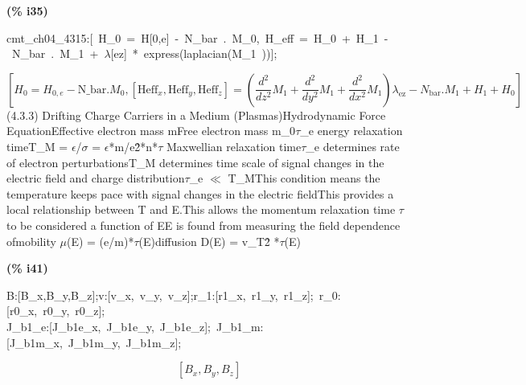 \documentclass[fleqn]{article}
\begin{document}
\noindent
\begin{minipage}[t]{4.000000em}\color{red}\bfseries
(\% i35)	
\end{minipage}
\begin{minipage}[t]{\textwidth}\color{blue}
cmt\_ch04\_4315:[\ H\_0\ =\ H[0,e]\ -\ N\_bar\ .\ M\_0,\ H\_eff\ =\ H\_0\ +\ H\_1\ -\ N\_bar\ .\ M\_1\ +\ \ensuremath{\lambda}[ez]\ *\ express(laplacian(M\_1\ ))];
\end{minipage}
\[\displaystyle \tag{\% o35} 
\left[ {H_0}={H_{0,e}}-\ensuremath{\mathrm{N\_ bar}}\ensuremath{\mathrm{ . }}{M_0}\operatorname{,}\left[ {{\ensuremath{\mathrm{Heff}}}_x}\operatorname{,}{{\ensuremath{\mathrm{Heff}}}_y}\operatorname{,}{{\ensuremath{\mathrm{Heff}}}_z}\right] =\left( \frac{{{d}^{2}}}{d {{z}^{2}}} {M_1}+\frac{{{d}^{2}}}{d {{y}^{2}}} {M_1}+\frac{{{d}^{2}}}{d {{x}^{2}}} {M_1}\right)  {{\lambda }_{\ensuremath{\mathrm{ez}}}}-{N_{\ensuremath{\mathrm{bar}}}}\ensuremath{\mathrm{ . }}{M_1}+{H_1}+{H_0}\right] \mbox{}
\]
(4.3.3) Drifting Charge Carriers in a Medium (Plasmas)Hydrodynamic Force EquationEffective electron mass        mFree electron mass              m\_0\ensuremath{\tau}\_e                                     energy relaxation timeT\_M = \ensuremath{\epsilon}/\ensuremath{\sigma} = \ensuremath{\epsilon}*m/e\^ 2*n*\ensuremath{\tau}   Maxwellian relaxation time\ensuremath{\tau}\_e determines rate of electron perturbationsT\_M determines time scale of signal changes in the electric field and charge distribution\ensuremath{\tau}\_e \ensuremath{\ll} T\_MThis condition means the temperature keeps pace with signal changes in the electric fieldThis provides a local relationship between T and E.This allows the momentum relaxation time \ensuremath{\tau} to be considered a function of EE is found from measuring the field dependence ofmobility \ensuremath{\mu}(E) = (e/m)*\ensuremath{\tau}(E)diffusion D(E) = v\_T\^ 2 *\ensuremath{\tau}(E)


\noindent
\begin{minipage}[t]{4.000000em}\color{red}\bfseries
(\% i41)	
\end{minipage}
\begin{minipage}[t]{\textwidth}\color{blue}
B:[B\_x,B\_y,B\_z];v:[v\_x,\ v\_y,\ v\_z];r\_1:[r1\_x,\ r1\_y,\ r1\_z];\ r\_0:[r0\_x,\ r0\_y,\ r0\_z];\\
J\_b1\_e:[J\_b1e\_x,\ J\_b1e\_y,\ J\_b1e\_z];\ J\_b1\_m:[J\_b1m\_x,\ J\_b1m\_y,\ J\_b1m\_z];\ 
\end{minipage}
\[\displaystyle \tag{\% o36} 
\left[ {B_x}\operatorname{,}{B_y}\operatorname{,}{B_z}\right] \mbox{}\]
\end{document}
